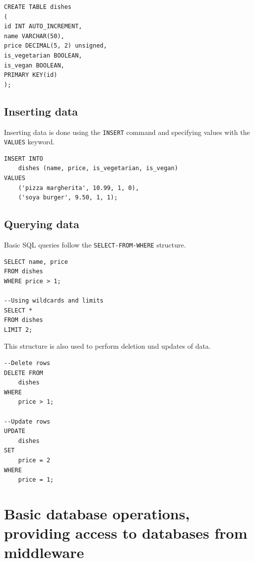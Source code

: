 \begin{verbatim}
CREATE TABLE dishes
(
id INT AUTO_INCREMENT,
name VARCHAR(50),
price DECIMAL(5, 2) unsigned,
is_vegetarian BOOLEAN,
is_vegan BOOLEAN,
PRIMARY KEY(id)
);
\end{verbatim}

\subsection{Inserting data}

Inserting data is done using the \texttt{INSERT} command and specifying values with the \texttt{VALUES} keyword.

\begin{verbatim}
INSERT INTO
	dishes (name, price, is_vegetarian, is_vegan)
VALUES
	('pizza margherita', 10.99, 1, 0),
	('soya burger', 9.50, 1, 1);
\end{verbatim}


\subsection{Querying data}
Basic SQL queries follow the \texttt{SELECT-FROM-WHERE} structure.

\begin{verbatim}
SELECT name, price
FROM dishes
WHERE price > 1;

--Using wildcards and limits
SELECT *
FROM dishes
LIMIT 2;
\end{verbatim}

This structure is also used to perform deletion und updates of data.

\begin{verbatim}
--Delete rows
DELETE FROM
	dishes
WHERE
	price > 1;

--Update rows
UPDATE
	dishes
SET
	price = 2
WHERE
	price = 1;	
\end{verbatim}

\section{Basic database operations, providing access to databases from middleware}

